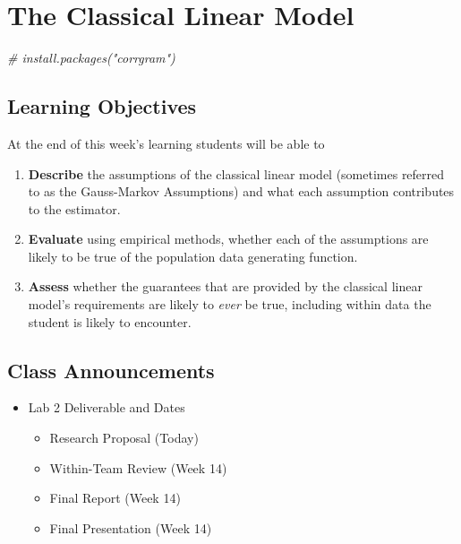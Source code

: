 \documentclass[
]{book}
\newenvironment{Shaded}{\begin{snugshade}}{\end{snugshade}}
\newcommand{\CommentTok}[1]{\textcolor[rgb]{0.56,0.35,0.01}{\textit{#1}}}
\providecommand{\tightlist}{%
  \setlength{\itemsep}{0pt}\setlength{\parskip}{0pt}}
\theoremstyle{definition}
\theoremstyle{definition}
\theoremstyle{definition}
\theoremstyle{definition}
\theoremstyle{remark}
\begin{document}
\hypertarget{the-classical-linear-model}{%
\chapter{The Classical Linear Model}\label{the-classical-linear-model}}

\begin{Shaded}
\begin{Highlighting}[]
\CommentTok{\# install.packages("corrgram")}
\end{Highlighting}
\end{Shaded}

\hypertarget{learning-objectives-11}{%
\section{Learning Objectives}\label{learning-objectives-11}}

At the end of this week's learning students will be able to

\begin{enumerate}
\def\labelenumi{\arabic{enumi}.}
\tightlist
\item
  \textbf{Describe} the assumptions of the classical linear model (sometimes referred to as the Gauss-Markov Assumptions) and what each assumption contributes to the estimator.
\item
  \textbf{Evaluate} using empirical methods, whether each of the assumptions are likely to be true of the population data generating function.
\item
  \textbf{Assess} whether the guarantees that are provided by the classical linear model's requirements are likely to \emph{ever} be true, including within data the student is likely to encounter.
\end{enumerate}

\hypertarget{class-announcements-10}{%
\section{Class Announcements}\label{class-announcements-10}}

\begin{itemize}
\tightlist
\item
  Lab 2 Deliverable and Dates

  \begin{itemize}
  \tightlist
  \item
    Research Proposal (Today)
  \item
    Within-Team Review (Week 14)
  \item
    Final Report (Week 14)
  \item
    Final Presentation (Week 14)
  \end{itemize}
\end{itemize}
\end{document}
